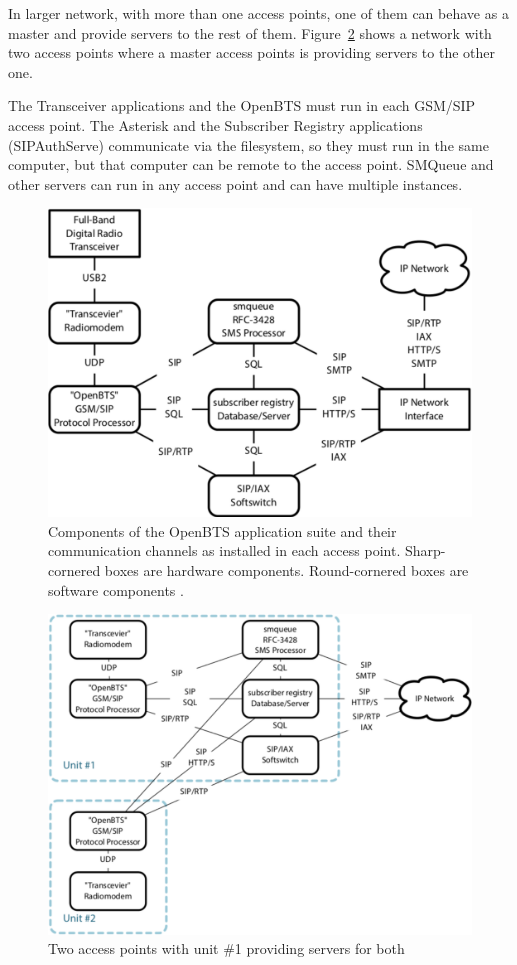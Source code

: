 In larger network, with more than one access points, one of them can behave as a master and provide servers to the rest of them.
Figure~\ref{fig:btsLarge} shows a network with two access points where
a master access points is providing servers to the other one.

The Transceiver applications and the OpenBTS must run in each GSM/SIP access point. 
The Asterisk and the Subscriber Registry applications (SIPAuthServe) 
communicate via the filesystem, so they must run in the same computer,
but that computer can be remote to the access point. 
SMQueue and other servers can run in any access point and can have 
multiple instances.
\begin{figure}
  \centering
    \includegraphics[width=\textwidth]{btsSimple}
  \caption[Simplest OpenBTS network]{Components of the OpenBTS application suite 
  and their communication channels as installed in each
access point. Sharp-cornered boxes are hardware components.
Round-cornered boxes are software components \protect\cite{openbtsMan}.}
  \label{fig:btsSimple}
\end{figure}

\begin{figure}
  \centering
    \includegraphics[width=\textwidth]{btsLarge}
  \caption[OpenBTS network with two access points]{Two access points with unit 
  \#1 providing servers for both \protect\cite{openbtsMan}}
  \label{fig:btsLarge}
\end{figure}

